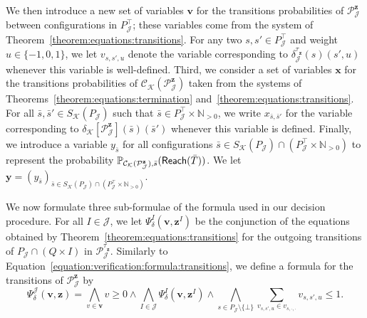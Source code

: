 \documentclass[a4paper,UKenglish,cleveref,autoref,thm-restate,colorlinks]{lipics-v2021}
\newcommand{\IN}{\mathbb{N}}
\newcommand{\INpos}{\IN_{>0}}
\newcommand{\mdpStateSpace}{S}
\newcommand{\weightVal}{u}
\newcommand{\ocStateSpace}{Q}
\newcommand{\ocConfig}{s}
\newcommand{\ocTrans}{\delta}
\newcommand{\mchain}{\mathcal{C}}
\newcommand{\ocChain}{\mathcal{P}}
\newcommand{\intPartB}{\mathcal{J}}
\newcommand{\intPartC}{\mathcal{K}}
\newcommand{\interval}{I}
\newcommand{\cisChainStrat}[1]{\ocChain^{#1}_{\intPartB}}
\newcommand{\cisChainStateSpace}{P_{\intPartB}}
\newcommand{\cisChainStateSpaceStar}{P_{\intPartB}^{\top}}
\newcommand{\cisChainTransTemplate}[2]{\ocTrans_{#1}^{#2}}
\newcommand{\compressCisStateSpace}{\mdpStateSpace_{\intPartC}({\cisChainStateSpace})}
\newcommand{\cisConfig}{\bar{\ocConfig}}
\newcommand{\varTrans}{x}
\newcommand{\varTransTuple}{\mathbf{\varTrans}}
\newcommand{\varObj}{y}
\newcommand{\varObjTuple}{\mathbf{\varObj}}
\newcommand{\varStrat}{z}
\newcommand{\varStratI}{\mathbf{\varStrat}^{\interval}}
\newcommand{\varStratTuple}{\mathbf{\varStrat}}
\newcommand{\varCis}{v}
\newcommand{\varCisTuple}{\mathbf{\varCis}}
\newcommand{\cisChainSymbolic}{\cisChainStrat{\varStratTuple}}
\newcommand{\cisChainTransSymbolic}{\cisChainTransTemplate{\intPartB}{\stratB_{\varStratTuple}}}
\newcommand{\compressCisSymbolic}{\mchain_{\intPartC}({\cisChainSymbolic})}
\newcommand{\compressCisTransSymbolic}{\ocTrans_{\intPartC}[{\cisChainSymbolic}]}
\newcommand{\formulaCisBase}{\Psi_{\ocTrans}}
\newcommand{\formulaCis}{\formulaCisBase^\intPartB}
\newcommand{\formulaCisI}{\formulaCisBase^\interval}
\newcommand{\reach}[1]{\mathsf{Reach}(#1)}
\newcommand{\target}{T}
\newcommand{\stratBGeneric}[1]{{\tau_{#1}}}
\newcommand{\stratB}{\stratBGeneric{}}
\begin{document}
We then introduce a new set of variables $\varCisTuple$ for the transitions probabilities of $\cisChainSymbolic$ between configurations in $\cisChainStateSpaceStar$; these variables come from the system of Theorem~\ref{theorem:equations:transitions}.
For any two $\ocConfig, \ocConfig'\in\cisChainStateSpaceStar$ and weight $\weightVal\in\{-1, 0, 1\}$, we let $\varCis_{\ocConfig, \ocConfig',\weightVal}$ denote the variable corresponding to $\cisChainTransSymbolic(\ocConfig)(\ocConfig', \weightVal)$ whenever this variable is well-defined.
Third, we consider a set of variables $\varTransTuple$ for the transitions probabilities of $\compressCisSymbolic$ taken from the systems of Theorems~\ref{theorem:equations:termination} and~\ref{theorem:equations:transitions}.
For all $\cisConfig, \cisConfig'\in\compressCisStateSpace$ such that $\cisConfig\in\cisChainStateSpaceStar\times\INpos$, we write $\varTrans_{\cisConfig, \cisConfig'}$ for the variable corresponding to $\compressCisTransSymbolic(\cisConfig)(\cisConfig')$ whenever this variable is defined.
Finally, we introduce a variable $\varObj_{\cisConfig}$ for all configurations $\cisConfig\in\compressCisStateSpace\cap(\cisChainStateSpaceStar\times\INpos)$ to represent the probability $\probaMCverb{\compressCisSymbolic}{\cisConfig}(\reach{\bar{\target}})$.
We let $\varObjTuple=(\varObj_{\cisConfig})_{\cisConfig\in\compressCisStateSpace\cap(\cisChainStateSpaceStar\times\INpos)}$.

We now formulate three sub-formulae of the formula used in our decision procedure.
For all $\interval\in\intPartB$, we let $\formulaCisI(\varCisTuple, \varStratI)$ be the conjunction of the equations obtained by Theorem~\ref{theorem:equations:transitions} for the outgoing transitions of $\cisChainStateSpace\cap(\ocStateSpace\times\interval)$ in $\cisChainStrat{\stratB_{\varStratTuple}}$.
Similarly to Equation~\eqref{equation:verification:formula:transitions}, we define a formula for the transitions of $\cisChainSymbolic$ by
\begin{equation}\label{equation:verification:formula:transitions:cis}
  \formulaCis(\varCisTuple, \varStratTuple) =
  \bigwedge_{\varCis\in\varCisTuple}\varCis\geq 0\land
  \bigwedge_{\interval\in\intPartB}
  \formulaCisI(\varCisTuple, \varStratI)\land
  \bigwedge_{\ocConfig\in\cisChainStateSpace\setminus\{\bot\}}
  \sum_{\varCis_{\ocConfig, \ocConfig', \weightVal}\in\varCis_{\ocConfig, \cdot, \cdot}}\varCis_{\ocConfig, \ocConfig', \weightVal}\leq 1.
\end{equation}
\end{document}
